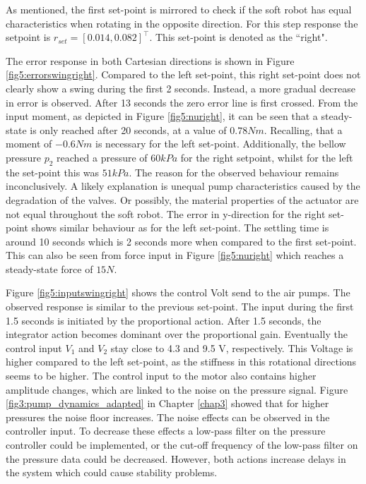 As mentioned, the first set-point is mirrored to check if the soft robot has equal characteristics when rotating in the opposite direction. For this step response the setpoint is $r_{set} = [0.014,0.082]^\top$. This set-point is denoted as the ``right".


The error response in both Cartesian directions is shown in Figure \ref{fig5:errorswingright}. Compared to the left set-point, this right set-point does not clearly show a swing during the first 2 seconds. Instead, a more gradual decrease in error is observed. After 13 seconds the zero error line is first crossed. From the input moment, as depicted in Figure \ref{fig5:nuright}, it can be seen that a steady-state is only reached after 20 seconds, at a value of $0.78 Nm$. Recalling, that a moment of $-0.6 Nm$ is necessary for the left set-point. Additionally, the bellow pressure $p_2$ reached a pressure of $60 kPa$ for the right setpoint, whilst for the left the set-point this was $51 kPa$. The reason for the observed behaviour remains inconclusively. A likely explanation is unequal pump characteristics caused by the degradation of the valves. Or possibly, the material properties of the actuator are not equal throughout the soft robot. The error in y-direction for the right set-point shows similar behaviour as for the left set-point. The settling time is around 10 seconds which is 2 seconds more when compared to the first set-point. This can also be seen from force input in Figure \ref{fig5:nuright} which reaches a steady-state force of $15 N$.

Figure \ref{fig5:inputswingright} shows the control Volt send to the air pumps. The observed response is similar to the previous set-point. The input during the first 1.5 seconds is initiated by the proportional action. After 1.5 seconds, the integrator action becomes dominant over the proportional gain. Eventually the control input $V_1$ and $V_2$ stay close to 4.3 and 9.5 V, respectively. This Voltage is higher compared to the left set-point, as the stiffness in this rotational directions seems to be higher. The control input to the motor also contains higher amplitude changes, which are linked to the noise on the pressure signal. Figure \ref{fig3:pump_dynamics_adapted} in Chapter \ref{chap3} showed that for higher pressures the noise floor increases. The noise effects can be observed in the controller input. To decrease these effects a low-pass filter on the pressure controller could be implemented, or the cut-off frequency of the low-pass filter on the pressure data could be decreased. However, both actions increase delays in the system which could cause stability problems.


